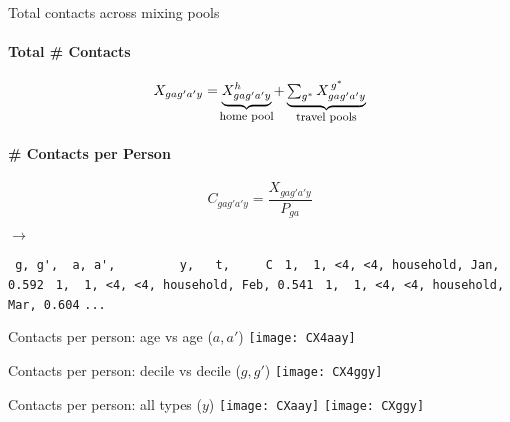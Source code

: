 \begin{frame}[fragile]{Total contacts across mixing pools}
  \begin{minipage}{0.45\linewidth}
    \paragraph{Total \# Contacts}
    \begin{equation*}
      X_{gag'a'y} =
      \ulabel{X^h_{gag'a'y}}{home pool} +
      \ulabel{\textstyle\sum_{g^*} X^{\,g^*}_{gag'a'y}}{travel pools}
    \end{equation*}
    \paragraph{\# Contacts per Person}
    \begin{equation*}
      C_{gag'a'y} = \displaystyle\frac{X_{gag'a'y}}{P_{ga}}
    \end{equation*}
  \end{minipage}\hfill\Large$\bm{\rightarrow}$\hfill%
  \begin{minipage}{0.45\linewidth}\footnotesize
      \verb| g, g',  a, a',         y,   t,     C|
      \verb| 1,  1, <4, <4, household, Jan, 0.592|
      \verb| 1,  1, <4, <4, household, Feb, 0.541|
      \verb| 1,  1, <4, <4, household, Mar, 0.604|
      \verb|...|
  \end{minipage}
\end{frame}
\begin{frame}{Contacts per person: age vs age ($a,a'$)}
  \texttt{[image: CX4aay]}
\end{frame}
\begin{frame}{Contacts per person: decile vs decile ($g,g'$)}
  \texttt{[image: CX4ggy]}
\end{frame}
\begin{frame}{Contacts per person: all types ($y$)}
  \centering
  \texttt{[image: CXaay]}
  \texttt{[image: CXggy]}
\end{frame}
